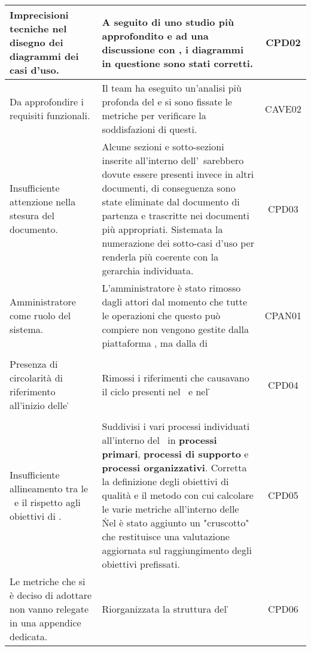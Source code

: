 \begin{longtable}{|C{4cm}|C{8cm}|c|}
		Imprecisioni tecniche nel disegno dei diagrammi dei casi d’uso. & A seguito di uno studio più approfondito e ad una discussione con \CR{}, i diagrammi in questione sono stati corretti. & CPD02\\ \hline %
		Da approfondire i requisiti funzionali. & Il team ha eseguito un'analisi più profonda del  e si sono fissate le metriche per verificare la soddisfazioni di questi. & CAVE02\\ \hline %
		Insufficiente attenzione nella stesura del documento. & Alcune sezioni e sotto-sezioni inserite all'interno dell'\AdR\ sarebbero dovute essere presenti invece in altri documenti, di conseguenza sono state eliminate dal documento di partenza e trascritte nei documenti più appropriati. Sistemata la numerazione dei sotto-casi d'uso per renderla più coerente con la gerarchia individuata. & CPD03\\ \hline %
		Amministratore come ruolo del sistema. & L'amministratore è stato rimosso dagli attori dal momento che tutte le operazioni che questo può compiere non vengono gestite dalla piattaforma \NomeProgetto, ma dalla  di  & CPAN01\\ \hline %
		\\ \hline
		Presenza di circolarità di riferimento all'inizio delle \NdP\. & Rimossi i riferimenti che causavano il ciclo presenti nel \PdP\ e nel \PdQ\. & CPD04\\ \hline %
		\\ \hline
		Insufficiente allineamento tra le \NdP\ e il \PdQ rispetto agli obiettivi di . & Suddivisi i vari processi individuati all'interno del \PdQ\ in \textbf{processi primari}, \textbf{processi di supporto} e \textbf{processi organizzativi}. Corretta la definizione degli obiettivi di qualità e il metodo con cui calcolare le varie metriche all'interno delle \NdP\. Nel \PdQ è stato aggiunto un "cruscotto" che restituisce una valutazione aggiornata sul raggiungimento degli obiettivi prefissati. & CPD05\\ \hline %
		Le metriche che si è deciso di adottare non vanno relegate in una appendice dedicata. & Riorganizzata la struttura del \PdQ\. & CPD06\\ \hline %
	\end{longtable}
